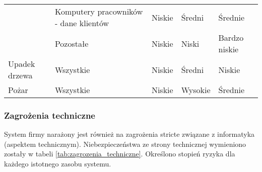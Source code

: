 \begin{landscape}[ht!]
\begin{longtable}{|m{4cm}|m{6cm}|m{4.5cm}|m{3cm}|m{3cm}|}
		\multicolumn{1}{|l|}{}                             & \multicolumn{1}{l|}{Komputery pracowników - dane klientów}  & \multicolumn{1}{l|}{Niskie}                      & \multicolumn{1}{l|}{Średni}         & \multicolumn{1}{l|}{Średnie}         \\ \cline{2-5} 
		\multicolumn{1}{|l|}{}                             & \multicolumn{1}{l|}{Pozostałe}                              & \multicolumn{1}{l|}{Niskie}                      & \multicolumn{1}{l|}{Niski}          & \multicolumn{1}{l|}{Bardzo niskie}   \\ \hline
		\multicolumn{1}{|l|}{Upadek drzewa}                & \multicolumn{1}{l|}{Wszystkie}                              & \multicolumn{1}{l|}{Niskie}                      & \multicolumn{1}{l|}{Średni}         & \multicolumn{1}{l|}{Niskie}          \\ \hline
		\multicolumn{1}{|l|}{Pożar}                        & \multicolumn{1}{l|}{Wszystkie}                              & \multicolumn{1}{l|}{Niskie}                      & \multicolumn{1}{l|}{Wysokie}        & \multicolumn{1}{l|}{Średnie}         \\ \hline                                 
	\end{longtable}
\end{landscape}

\subsubsection{Zagrożenia techniczne}
System firmy narażony jest również na zagrożenia stricte związane z informatyka (aspektem technicznym). Niebezpieczeństwa ze strony technicznej wymieniono zostały w tabeli  \ref{tab:zagrozenia_techniczne}. Określono stopień ryzyka dla każdego istotnego zasobu systemu.

